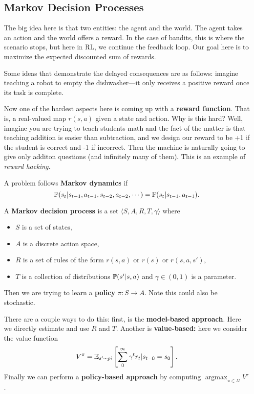 \documentclass[12pt]{article}
\DeclareMathOperator*{\argmax}{argmax}
\begin{document}
\subsection{Markov Decision Processes}
The big idea here is that two entities: the agent and the world. The agent takes an action and the world offers a reward. In the case of bandits, this is where the scenario stops,
but here in RL, we continue the feedback loop. Our goal here is to maximize the expected discounted sum of rewards.

Some ideas that demonstrate the delayed consequences are as follows: imagine teaching a robot to empty the dishwasher---it only receives a positive reward once its task is complete. 

Now one of the hardest aspects here is coming up with a \textbf{reward function}. That is, a real-valued map $r(s,a)$ given a state and action. Why is this hard?
Well, imagine you are trying to teach students math and the fact of the matter is that teaching addition is easier than subtraction, and we design our reward to be +1 if the student is correct and -1 if incorrect.
Then the machine is naturally going to give only additon questions (and infinitely many of them). This is an example of \textit{reward hacking.}

A problem follows \textbf{Markov dynamics} if 
\[\mathbb{P}(s_t|s_{t-1},a_{t-1},s_{t-2},a_{t-2},\cdots)=\mathbb{P}(s_t|s_{t-1},a_{t-1}).\]
\begin{defn}
	A \textbf{Markov decision process} is a set $\langle S,A,R,T,\gamma\rangle$ where 
	\begin{itemize}
		\item $S$ is a set of states,
		\item $A$ is a discrete action space,
		\item $R$ is a set of rules of the form $r(s,a)$ or $r(s)$ or $r(s,a,s')$,
		\item $T$ is a collection of distributions $\mathbb{P}(s'|s,a)$ and $\gamma\in(0,1)$ is a parameter.
	\end{itemize}

	Then we are trying to learn a \textbf{policy} $\pi:S\to A$. Note this could also be stochastic.
\end{defn}

There are a couple ways to do this: first, is the \textbf{model-based approach}. Here we directly estimate and use $R$ and $T$. Another is \textbf{value-based:}
here we consider the value function 
\[V^\pi=\mathbb{E}_{s'\sim pi}\left[\sum_0^\infty\gamma^tr_t|s_{t=0}=s_0\right].\]
Finally we can perform a \textbf{policy-based approach} by computing $\argmax_{\pi\in\Pi}V^\pi$.
\end{document}
